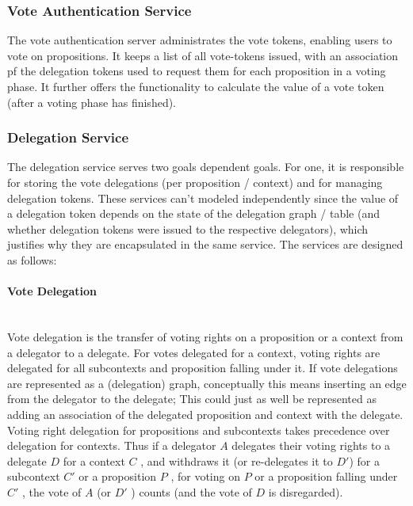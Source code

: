 \subsubsection{Vote Authentication Service}
The vote authentication server administrates the vote tokens, enabling users to vote on propositions. It keeps a list of all vote-tokens issued, with an association pf the delegation tokens used to request them for each proposition in a voting phase. It further offers the functionality to calculate the value of a vote token (after a voting phase has finished).

\subsubsection{Delegation Service}
The delegation service serves two goals dependent goals. For one, it is responsible for storing the vote delegations (per proposition / context) and for managing delegation tokens. These services can't modeled independently since the value of a delegation token depends on the state of the delegation graph / table (and whether delegation tokens were issued to the respective delegators), which justifies why they are encapsulated in the same service.
% 
% 
% 
The services are designed as follows:

\paragraph*{Vote Delegation} \mbox{} \\
Vote delegation is the transfer of voting rights on a proposition or a context from a delegator to a delegate. For votes delegated for a context, voting rights are delegated for all subcontexts and proposition falling under it. If vote delegations are represented as a (delegation) graph, conceptually this means inserting an edge from the delegator to the delegate; This could just as well be represented as adding an association of the delegated proposition and context with the delegate.
% 
% 
% 
Voting right delegation for propositions and subcontexts takes precedence over delegation for contexts. Thus if a delegator $A$ delegates their voting rights to a delegate $D$ for a context $C$ , and withdraws it (or re-delegates it to $D'$) for a subcontext $C'$ or a proposition $P$ , for voting on $P$ or a proposition falling under $C'$ , the vote of $A$ (or $D'$ ) counts (and the vote of $D$ is disregarded).

